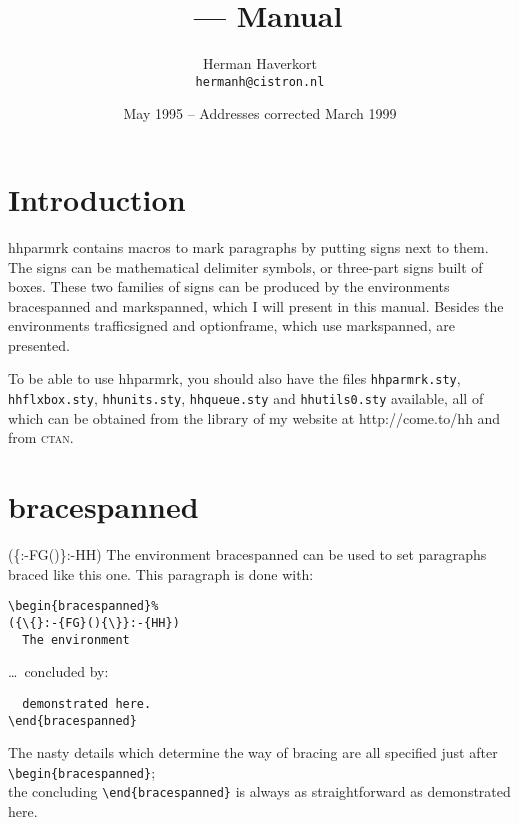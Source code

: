 \documentclass[11pt]{article}
\title{\hhparmrk\ --- Manual}
\author{Herman Haverkort\\\normalsize\normalfont\texttt{hermanh@cistron.nl}}
\date{May 1995 -- Addresses corrected March 1999}
\def\packagename#1{{\sffamily #1}}     %
\def\envirname#1{{\ttfamily #1}}       %
\def\hhparmrk{\packagename{hhparmrk}\xspace}
\def\={\verb=}
\begin{document}
\maketitle

\section{Introduction}

\hhparmrk contains macros to mark paragraphs by putting signs next to
them. The signs can be mathematical delimiter symbols, or three-part signs
built of boxes. These two families of signs can be produced by the
environments \envirname{bracespanned} and \envirname{markspanned},
which I will present in this manual. Besides the environments
\envirname{trafficsigned} and \envirname{optionframe}, which use
\envirname{markspanned}, are presented.

To be able to use \hhparmrk, you should also have the
files \texttt{hhparmrk.sty}, \texttt{hhflxbox.sty}, \texttt{hhunits.sty},
\texttt{hhqueue.sty} and \texttt{hhutils0.sty} available, all of
which can be obtained from the library of my website at
http://come.to/hh and from \textsc{ctan}.

\section{\envirname{bracespanned}}

\begin{bracespanned}%
({\{}:-{FG}(){\}}:-{HH})
  The environment
\envirname{bracespanned} can be used to set paragraphs
braced like this one. This paragraph is done with:

\begin{verbatim}
\begin{bracespanned}%
({\{}:-{FG}(){\}}:-{HH})
  The environment
\end{verbatim}

\ldots\ concluded by:

\begin{verbatim}
  demonstrated here.
\end{bracespanned}
\end{verbatim}

The nasty details which determine the way of bracing are all specified
just after \=\begin{bracespanned}=;\\ the concluding \=\end{bracespanned}= is
always as straightforward as %
  demonstrated here.
\end{bracespanned}
\end{document}
